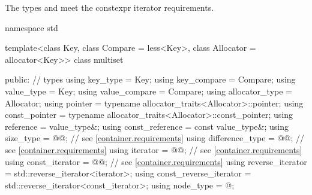 \pnum
The types  and  meet
the constexpr iterator requirements.

\begin{codeblock}
namespace std {
  template<class Key, class Compare = less<Key>,
           class Allocator = allocator<Key>>
  class multiset {
  public:
    // types
    using key_type               = Key;
    using key_compare            = Compare;
    using value_type             = Key;
    using value_compare          = Compare;
    using allocator_type         = Allocator;
    using pointer                = typename allocator_traits<Allocator>::pointer;
    using const_pointer          = typename allocator_traits<Allocator>::const_pointer;
    using reference              = value_type&;
    using const_reference        = const value_type&;
    using size_type              = @@; // see \ref{container.requirements}
    using difference_type        = @@; // see \ref{container.requirements}
    using iterator               = @@; // see \ref{container.requirements}
    using const_iterator         = @@; // see \ref{container.requirements}
    using reverse_iterator       = std::reverse_iterator<iterator>;
    using const_reverse_iterator = std::reverse_iterator<const_iterator>;
    using node_type              = @\unspec@;

}}
\end{codeblock}
